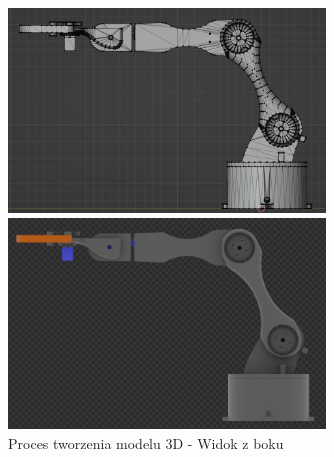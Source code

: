\documentclass[11pt,titlepage,a4paper]{article}
\begin{document}
\begin{figure}[h!]
    \begin{center}
        \includegraphics[width=0.75\textwidth]{img/leftW.png}
    \end{center}
    \begin{center}
        \includegraphics[width=0.75\textwidth]{img/leftC.png}
    \end{center}
    \caption{Proces tworzenia modelu 3D - Widok z boku}
    \label{Modelowanie3Dleft}
\end{figure}
\end{document}
